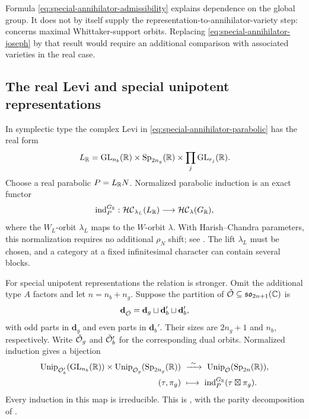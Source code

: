 \begin{rk}
Formula \eqref{eq:special-annihilator-admissibility} explains dependence
on the global group. It does not by itself supply the
representation-to-annihilator-variety step:
\cite[Thm.~1.1]{GGS21} concerns maximal Whittaker-support orbits.
Replacing \eqref{eq:special-annihilator-joseph} by that result would
require an additional comparison with associated varieties in the real
case.
\end{rk}

\subsection{The real Levi and special unipotent representations}

In symplectic type the complex Levi in
\eqref{eq:special-annihilator-parabolic} has the real form
\[
  L_{\mathbb{R}}=\operatorname{GL}_{n_b}(\mathbb{R})\times\operatorname{Sp}_{2n_g}(\mathbb{R})
                \times\prod_j\operatorname{GL}_{r_j}(\mathbb{R}).
\]
Choose a real parabolic $P=L_{\mathbb{R}}N$. Normalized parabolic induction
is an exact functor
\[
  \operatorname{ind}_P^{G_{\mathbb{R}}}:\mathcal{HC}_{\lambda_L}(L_{\mathbb{R}})
                   \longrightarrow\mathcal{HC}_\lambda(G_{\mathbb{R}}),
\]
where the $W_L$-orbit $\lambda_L$ maps to the $W$-orbit $\lambda$.
With Harish--Chandra parameters, this normalization requires no
additional $\rho_N$ shift; see \cite[\S\S4.1 and 9.2]{BMSZ22}.
The lift $\lambda_L$ must be chosen, and a category at a fixed
infinitesimal character can contain several blocks.

For special unipotent representations the relation is stronger.
Omit the additional type $A$ factors and let $n=n_b+n_g$. Suppose the
partition of $\check{\mathcal{O}}\subseteq\mathfrak{so}_{2n+1}(\mathbb{C})$ is
\[
  \mathbf d_{\check{\mathcal{O}}}
  =\mathbf d_g\sqcup\mathbf d_b'\sqcup\mathbf d_b',
\]
with odd parts in $\mathbf d_g$ and even parts in $\mathbf d_b'$.
Their sizes are $2n_g+1$ and $n_b$, respectively. Write
$\check{\mathcal{O}}_g$ and $\check{\mathcal{O}}_b'$ for the corresponding dual orbits.
Normalized induction gives a bijection
\begin{equation}\label{eq:special-annihilator-unipotent}
\begin{split}
  \operatorname{Unip}_{\check{\mathcal{O}}_b'}(\operatorname{GL}_{n_b}(\mathbb{R}))
  \times\operatorname{Unip}_{\check{\mathcal{O}}_g}(\operatorname{Sp}_{2n_g}(\mathbb{R}))
  &\ \xrightarrow{\ \sim\ }\
     \operatorname{Unip}_{\check{\mathcal{O}}}(\operatorname{Sp}_{2n}(\mathbb{R})),\\
  (\tau,\pi_g)&\ \longmapsto\
     \operatorname{ind}_P^{G_{\mathbb{R}}}(\tau\boxtimes\pi_g).
\end{split}
\end{equation}
Every induction in this map is irreducible. This is
\cite[Thm.~2.20 and Prop.~9.5]{BMSZ22}, with the parity decomposition
of \cite[\S2.6]{BMSZ22}.

